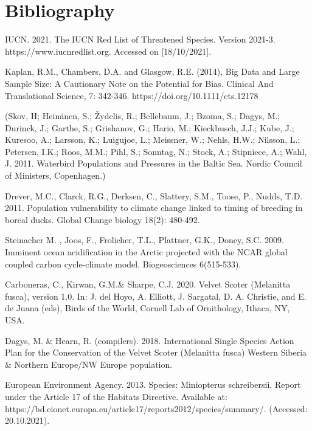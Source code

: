 \documentclass[12pt,a4paper]{article}
\begin{document}
\section{Bibliography}
\begin{thebibliography}{999}

IUCN. 2021. The IUCN Red List of Threatened Species. Version 2021-3. https://www.iucnredlist.org. Accessed on [18/10/2021].

Kaplan, R.M., Chambers, D.A. and Glasgow, R.E. (2014), Big Data and Large Sample Size: A Cautionary Note on the Potential for Bias. Clinical And Translational Science, 7: 342-346. https://doi.org/10.1111/cts.12178
 
(Skov, H; Heinänen, S.; Žydelis, R.; Bellebaum, J.; Bzoma, S.; Dagys, M.; Durinck, J.; Garthe, S.; Grishanov, G.; Hario, M.; Kieckbusch, J.J.; Kube, J.; Kuresoo, A.; Larsson, K.; Luigujoe, L.; Meissner, W.; Nehls, H.W.; Nilsson, L.; Petersen, I.K.; Roos, M.M.; Pihl, S.; Sonntag, N.; Stock, A.; Stipniece, A.; Wahl, J. 2011. Waterbird Populations and Pressures in the Baltic Sea. Nordic Council of Ministers, Copenhagen.)

Drever, M.C., Clarck, R.G., Derksen, C., Slattery, S.M., Toose, P., Nudds, T.D. 2011. Population vulnerability to climate change linked to timing of breeding in boreal ducks. Global Change biology 18(2): 480-492.

Steinacher M. , Joos, F., Frolicher, T.L., Plattner, G.K., Doney, S.C. 2009. Imminent ocean acidification in the Arctic projected with the NCAR global coupled carbon cycle-climate model. Biogeosciences 6(515-533).

Carboneras, C., Kirwan, G.M.\& Sharpe, C.J. 2020. Velvet Scoter (Melanitta fusca), version 1.0. In: J. del Hoyo, A. Elliott, J. Sargatal, D. A. Christie, and E. de Juana (eds), Birds of the World, Cornell Lab of Ornithology, Ithaca, NY, USA.

Dagys, M. \& Hearn, R. (compilers). 2018. International Single Species Action Plan for the Conservation of the Velvet Scoter (Melanitta fusca) Western Siberia \& Northern Europe/NW Europe population.

European Environment Agency. 2013. Species: Miniopterus schreibersii. Report under the Article 17 of the Habitats Directive. Available at: https://bd.eionet.europa.eu/article17/reports2012/species/summary/. (Accessed: 20.10.2021).


\end{thebibliography}
\end{document}
